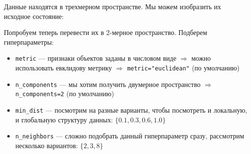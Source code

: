 Данные находятся в трехмерном пространстве. Мы можем изобразить их исходное состояние:
\begin{center}
	\begin{figure}[H]
		\noindent {}
	\end{figure} 
\end{center}

Попробуем теперь перевести их в 2-мерное пространство. Подберем гиперпараметры:
\begin{itemize}
	\item \verb|metric| --- признаки объектов заданы в числовом виде $\Rightarrow$ можно использовать евклидову метрику $\Rightarrow$ \verb|metric="euclidean"| (по умолчанию)
	\item \verb|n_components| --- мы хотим получить двумерное пространство $\Rightarrow$ \verb|n_components=2| (по умолчанию)
	\item \verb|min_dist| --- посмотрим на разные варианты, чтобы посмотреть и локальную, и глобальную структуру данных: $\{0.1, 0.3, 0.6, 1.0\}$
	\item \verb|n_neighbors| --- сложно подобрать данный гиперпараметр сразу, рассмотрим несколько вариантов: $\{2, 3, 8\}$
\end{itemize}

